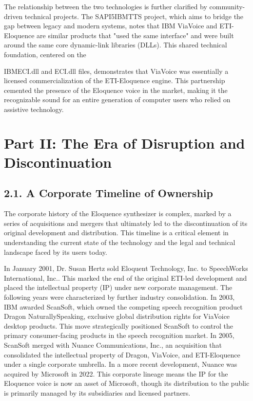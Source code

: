 The relationship between the two technologies is further clarified by
community-driven technical projects. The SAPI5IBMTTS project, which aims
to bridge the gap between legacy and modern systems, notes that IBM
ViaVoice and ETI-Eloquence are similar products that "used the same
interface" and were built around the same core dynamic-link libraries
(DLLs).\supercite{8} This shared technical foundation, centered on the

IBMECI.dll and ECI.dll files, demonstrates that ViaVoice was essentially
a licensed commercialization of the ETI-Eloquence engine.\supercite{8} This
partnership cemented the presence of the Eloquence voice in the market,
making it the recognizable sound for an entire generation of computer
users who relied on assistive technology.

\section{Part II: The Era of Disruption and Discontinuation}
\subsection{2.1. A Corporate Timeline of Ownership}
The corporate history of the Eloquence synthesizer is complex, marked by
a series of acquisitions and mergers that ultimately led to the
discontinuation of its original development and distribution. This
timeline is a critical element in understanding the current state of the
technology and the legal and technical landscape faced by its users
today.

In January 2001, Dr. Susan Hertz sold Eloquent Technology, Inc. to
SpeechWorks International, Inc..\supercite{1} This marked the end of the original
ETI-led development and placed the intellectual property (IP) under new
corporate management. The following years were characterized by further
industry consolidation. In 2003, IBM awarded ScanSoft, which owned the
competing speech recognition product Dragon NaturallySpeaking, exclusive
global distribution rights for ViaVoice desktop products.\supercite{7} This move
strategically positioned ScanSoft to control the primary consumer-facing
products in the speech recognition market. In 2005, ScanSoft merged with
Nuance Communications, Inc., an acquisition that consolidated the
intellectual property of Dragon, ViaVoice, and ETI-Eloquence under a
single corporate umbrella.\supercite{7} In a more recent development, Nuance was
acquired by Microsoft in 2022. This corporate lineage means the IP for
the Eloquence voice is now an asset of Microsoft, though its
distribution to the public is primarily managed by its subsidiaries and
licensed partners.

